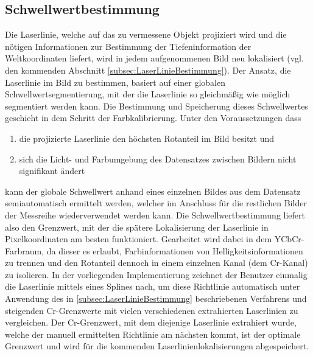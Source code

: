 \subsection{Schwellwertbestimmung}
\label{subsec:Farbkalibrierung}
Die Laserlinie, welche auf das zu vermessene Objekt projiziert wird und die nötigen Informationen zur Bestimmung der Tiefeninformation der Weltkoordinaten liefert, wird in jedem aufgenommenen Bild neu lokalisiert (vgl. den kommenden Abschnitt \ref{subsec:LaserLinieBestimmung}). Der Ansatz, die Laserlinie im Bild zu bestimmen, basiert auf einer globalen Schwellwertsegmentierung, mit der die Laserlinie so gleichmäßig wie möglich segmentiert werden kann. Die Bestimmung und Speicherung dieses Schwellwertes geschieht in dem Schritt der Farbkalibrierung. Unter den Voraussetzungen dass 
\begin{enumerate}
\item die projizierte Laserlinie den höchsten Rotanteil im Bild besitzt und 
\item sich die Licht- und Farbumgebung des Datensatzes zwischen Bildern nicht signifikant ändert
\end{enumerate} 
kann der globale Schwellwert anhand eines einzelnen Bildes aus dem Datensatz semiautomatisch ermittelt werden, welcher im Anschluss für die restlichen Bilder der Messreihe wiederverwendet werden kann. \newline
Die Schwellwertbestimmung liefert also den Grenzwert, mit der die spätere Lokalisierung der Laserlinie in Pixelkoordinaten am besten funktioniert. Gearbeitet wird dabei in dem YCbCr-Farbraum, da dieser es erlaubt, Farbinformationen von Helligkeitsinformationen zu trennen und den Rotanteil dennoch in einem einzelnen Kanal (dem Cr-Kanal) zu isolieren. In der vorliegenden Implementierung zeichnet der Benutzer einmalig die Laserlinie mittels eines Splines nach, um diese Richtlinie automatisch unter Anwendung des in \ref{subsec:LaserLinieBestimmung} beschriebenen Verfahrens und steigenden Cr-Grenzwerte mit vielen verschiedenen extrahierten Laserlinien zu vergleichen. Der Cr-Grenzwert, mit dem diejenige Laserlinie extrahiert wurde, welche der manuell ermittelten Richtlinie am nächsten kommt, ist der optimale Grenzwert und wird für die kommenden Laserlinienlokalisierungen abgespeichert.
\bigbreak

